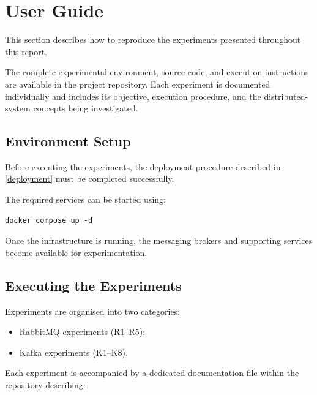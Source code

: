 \documentclass{scrartcl}
\begin{document}
\section{User Guide}
\label{user-guide}

This section describes how to reproduce the experiments presented throughout this report.

The complete experimental environment, source code, and execution instructions are available in the project repository. Each experiment is documented individually and includes its objective, execution procedure, and the distributed-system concepts being investigated.

\subsection{Environment Setup}

Before executing the experiments, the deployment procedure described in \cref{deployment} must be completed successfully.

The required services can be started using:

\begin{verbatim}
docker compose up -d
\end{verbatim}

Once the infrastructure is running, the messaging brokers and supporting services become available for experimentation.

\subsection{Executing the Experiments}

Experiments are organised into two categories:

\begin{itemize}
\item RabbitMQ experiments (R1--R5);
\item Kafka experiments (K1--K8).
\end{itemize}

Each experiment is accompanied by a dedicated documentation file within the repository describing:

\end{document}
